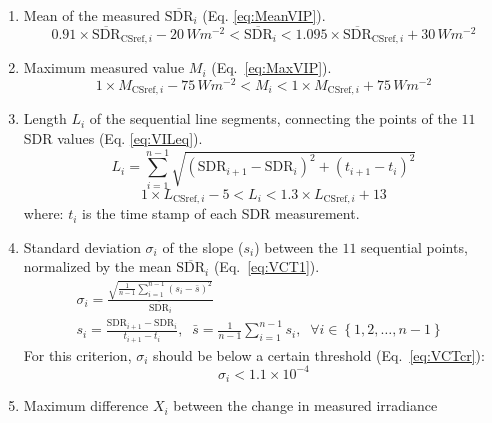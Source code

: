 \documentclass[applsci,article,submit,moreauthors,pdftex]{Definitions/mdpi}
\providecommand{\tightlist}{%
  \setlength{\itemsep}{0pt}\setlength{\parskip}{0pt}}
\begin{document}
\begin{enumerate}
\def\labelenumi{\alph{enumi})}
\tightlist
\item
  Mean of the measured \(\overline{\text{SDR}}_i\) (Eq.
  \ref{eq:MeanVIP}). \begin{equation}
  0.91 \times \overline{\text{SDR}}_{\text{CSref},i} - 20\,Wm^{-2}
  < \overline{\text{SDR}}_i <
  1.095 \times \overline{\text{SDR}}_{\text{CSref},i} + 30\,Wm^{-2}
  \label{eq:MeanVIP}
  \end{equation}
\item
  Maximum measured value \(M_{i}\) (Eq.~\ref{eq:MaxVIP}).
  \begin{equation}
  1 \times M_{\text{CSref},i} - 75\,Wm^{-2}
  < M_{i} <
  1 \times M_{\text{CSref},i} + 75\,Wm^{-2}
  \label{eq:MaxVIP}
  \end{equation}
\item
  Length \(L_i\) of the sequential line segments, connecting the points
  of the \(11\) SDR values (Eq. \ref{eq:VILeq}). \begin{equation}
  L_i = \sum_{i=1}^{n-1}\sqrt{\left ( \text{SDR}_{i+1} - \text{SDR}_{i}\right )^2 + \left ( t_{i+1} - t_i \right )^2}
  \label{eq:VILeq}
  \end{equation} \begin{equation}
  1 \times L_{\text{CSref},i} - 5 < L_i < 1.3 \times L_{\text{CSref},i} + 13
  \label{eq:VILcr}
  \end{equation} where: \(t_i\) is the time stamp of each SDR
  measurement.
\item
  Standard deviation \(\sigma_i\) of the slope (\(s_i\)) between the
  \(11\) sequential points, normalized by the mean
  \(\overline{\text{SDR}}_i\) (Eq.~\ref{eq:VCT1}). \begin{gather}
    \sigma_i = \frac {\sqrt{\frac{1}{n-1} \sum_{i=1}^{n-1} \left( s_i - \bar{s} \right)^2}} {\overline{\text{SDR}}_i} \label{eq:VCT1} \\
    s_i = \frac{\text{SDR}_{i+1} - \text{SDR}_{i}}{t_{i+1} - t_i},\;\;   \bar{s} = \frac{1}{n-1} \sum_{i=1}^{n-1} s_i,\;\;\forall i \in \left \{ 1, 2, \ldots, n-1 \right \}\;\;
  \end{gather} For this criterion, \(\sigma_i\) should be below a
  certain threshold (Eq.~\ref{eq:VCTcr}): \begin{equation}
    \sigma_i < \ensuremath{1.1\times 10^{-4}} \label{eq:VCTcr}
  \end{equation}
\item
  Maximum difference \(X_i\) between the change in measured irradiance

\end{enumerate}
\end{document}
